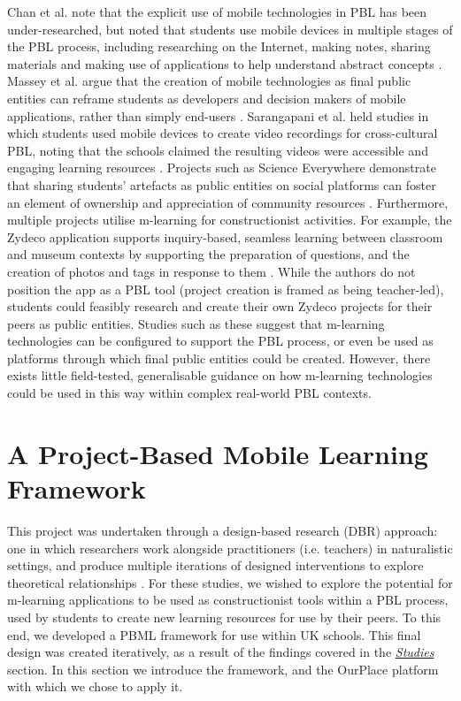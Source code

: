 \documentclass[,hyphens]{sigchi}
\begin{document}
Chan et al. note that the explicit use of mobile technologies in PBL has been under-researched, but noted that students use mobile devices in multiple stages of the PBL process, including researching on the Internet, making notes, sharing materials and making use of applications to help understand abstract concepts \cite{Chan2015}. Massey et al. argue that the creation of mobile technologies as final public entities can reframe students as developers and decision makers of mobile applications, rather than simply end-users \cite{Massey2006, Rahman2018}. Sarangapani et al. held studies in which students used mobile devices to create video recordings for cross-cultural PBL, noting that the schools claimed the resulting videos were accessible and engaging learning resources \cite{Sarangapani2016}. Projects such as Science Everywhere demonstrate that sharing students' artefacts as public entities on social platforms can foster an element of ownership and appreciation of community resources \cite{ahn2018}. Furthermore, multiple projects utilise m-learning for constructionist activities. For example, the Zydeco application supports inquiry-based, seamless learning between classroom and museum contexts by supporting the preparation of questions, and the creation of photos and tags in response to them \cite{kuhn2011}. While the authors do not position the app as a PBL tool (project creation is framed as being teacher-led), students could feasibly research and create their own Zydeco projects for their peers as public entities. Studies such as these suggest that m-learning technologies can be configured to support the PBL process, or even be used as platforms through which final public entities could be created. However, there exists little field-tested, generalisable guidance on how m-learning technologies could be used in this way within complex real-world PBL contexts.

\section{A Project-Based Mobile Learning Framework}
This project was undertaken through a design-based research (DBR) approach: one in which researchers work alongside practitioners (i.e. teachers) in naturalistic settings, and produce multiple iterations of designed interventions to explore theoretical relationships \cite{Barab2004}. For these studies, we wished to explore the potential for m-learning applications to be used as constructionist tools within a PBL process, used by students to create new learning resources for use by their peers. To this end, we developed a PBML framework for use within UK schools. This final design was created iteratively, as a result of the findings covered in the \textit{\hyperref[Studies]{Studies}} section. In this section we introduce the framework, and the OurPlace platform with which we chose to apply it.
\end{document}
